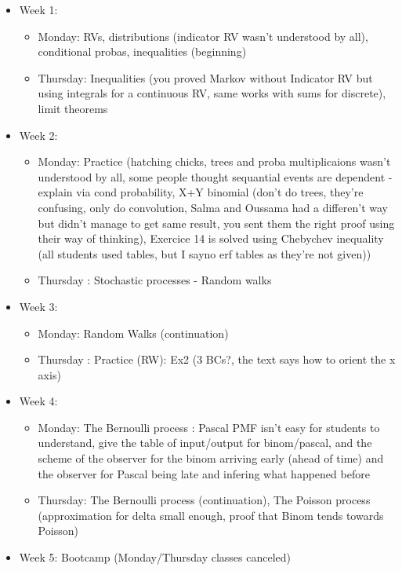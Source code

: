 \documentclass[12pt,a4paper]{article}
\begin{document}
  
  \begin{itemize}
  	\item Week 1: 
  	\begin{itemize}
  		\item Monday: RVs, distributions (indicator RV wasn't understood by all), conditional probas, inequalities (beginning)
  		\item Thursday: Inequalities (you proved Markov without Indicator RV but using integrals for a continuous RV, same works with sums for discrete), limit theorems
  	\end{itemize}
  	\item Week 2: 
  	\begin{itemize}
  	\item Monday: Practice (hatching chicks, trees and proba multiplicaions wasn't understood by all, some people thought sequantial events are dependent - explain via cond probability, X+Y binomial (don't do trees, they're confusing, only do convolution, Salma and Oussama had a differen't way but didn't manage to get same result, you sent them the right proof using their way of thinking), Exercice 14 is solved using Chebychev inequality (all students used tables, but I sayno erf tables as they're not given))
  	\item Thursday : Stochastic processes - Random walks
  	\end{itemize}
  	\item Week 3: 
  	\begin{itemize}
  	\item Monday: Random Walks (continuation)
  	\item Thursday : Practice (RW): Ex2 (3 BCs?, the text says how to orient the x axis)
  	\end{itemize}
  	\item Week 4: 
  	\begin{itemize}
  	\item Monday: The Bernoulli process : Pascal PMF isn't easy for students to understand, give the table of input/output for binom/pascal, and the scheme of the observer for the binom arriving early (ahead of time) and the observer for Pascal being late and infering what happened before
  	\item Thursday: The Bernoulli process (continuation), The Poisson process (approximation for delta small enough, proof that Binom tends towards Poisson) 
  	\end{itemize}
  	\item Week 5: Bootcamp (Monday/Thursday classes canceled)

\end{itemize}
\end{document}
